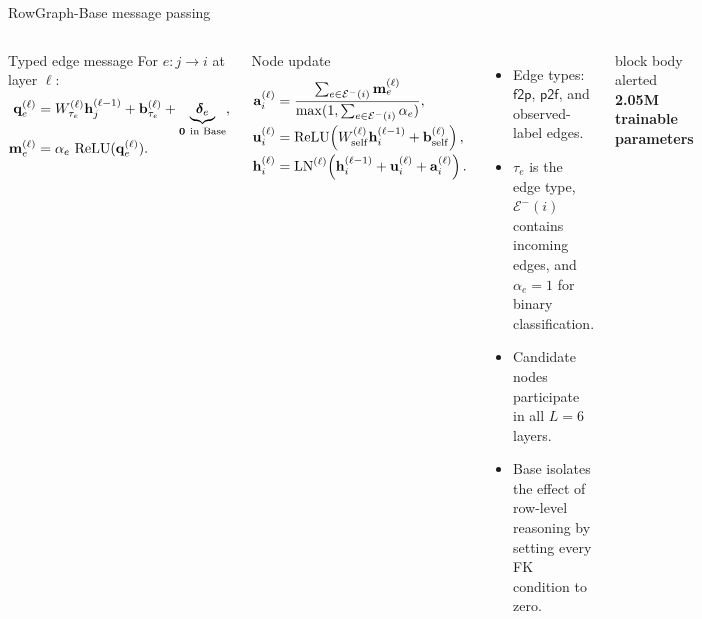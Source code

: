 \documentclass[aspectratio=169,10pt,t]{beamer}
\begin{document}
\begin{frame}{RowGraph-Base message passing}
  \begin{columns}[T,onlytextwidth]
      \vspace{0pt}
      \begin{block}{Typed edge message}
        For $e:j\rightarrow i$ at layer $\ell$:
        \[
        \setlength{\jot}{.18em}
        \begin{aligned}
          \mathbf q_e^{(\ell)}
          &=W_{\tau_e}^{(\ell)}\mathbf h_j^{(\ell-1)}
            +\mathbf b_{\tau_e}^{(\ell)}
            +\underbrace{\bm\delta_e}_{\mathbf 0\ \text{in Base}},\\
          \mathbf m_e^{(\ell)}
          &=\alpha_e\,\operatorname{ReLU}(\mathbf q_e^{(\ell)}).
        \end{aligned}
        \]
      \end{block}
      \vspace{-.06cm}
      \begin{exampleblock}{Node update}
        \[
        \setlength{\jot}{.18em}
        \begin{aligned}
          \mathbf a_i^{(\ell)}
          &=\frac{\sum_{e\in\mathcal E^-(i)}\mathbf m_e^{(\ell)}}
          {\max(1,\sum_{e\in\mathcal E^-(i)}\alpha_e)},\\
          \mathbf u_i^{(\ell)}
          &=\operatorname{ReLU}\!\left(
            W_{\mathrm{self}}^{(\ell)}\mathbf h_i^{(\ell-1)}
            +\mathbf b_{\mathrm{self}}^{(\ell)}\right),\\
          \mathbf h_i^{(\ell)}
          &=\operatorname{LN}^{(\ell)}\!\left(
            \mathbf h_i^{(\ell-1)}+\mathbf u_i^{(\ell)}+\mathbf a_i^{(\ell)}\right).
        \end{aligned}
        \]
      \end{exampleblock}

      \vspace{0pt}
      \begin{itemize}
        \item Edge types: $\mathsf{f2p}$, $\mathsf{p2f}$, and observed-label edges.
        \item $\tau_e$ is the edge type, $\mathcal E^-(i)$ contains incoming edges, and $\alpha_e=1$ for binary classification.
        \item Candidate nodes participate in all $L=6$ layers.
        \item Base isolates the effect of row-level reasoning by setting every FK condition to zero.
      \end{itemize}
      \vspace{.25cm}
      \begin{beamercolorbox}[sep=.55em,wd=\linewidth]{block body alerted}
        \centering\bfseries 2.05M trainable parameters
      \end{beamercolorbox}
  \end{columns}
\end{frame}
\end{document}
